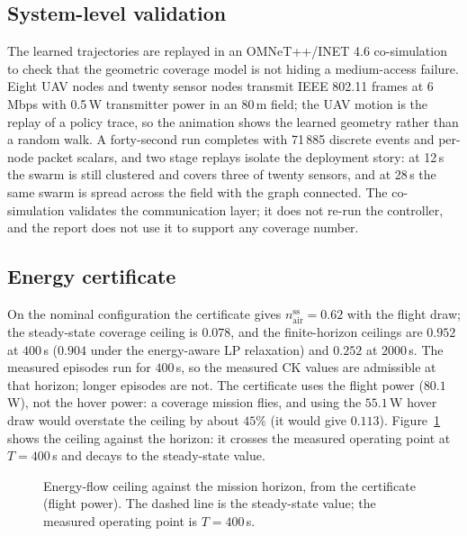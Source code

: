 \documentclass[conference]{IEEEtran}
\newcommand{\ck}{\mathrm{CK}}
\begin{document}
\subsection{System-level validation}
The learned trajectories are replayed in an OMNeT++/INET 4.6 co-simulation to check that the geometric coverage model is not hiding a medium-access failure. Eight UAV nodes and twenty sensor nodes transmit IEEE 802.11 frames at 6\,Mbps with 0.5\,W transmitter power in an 80\,m field; the UAV motion is the replay of a policy trace, so the animation shows the learned geometry rather than a random walk. A forty-second run completes with 71\,885 discrete events and per-node packet scalars, and two stage replays isolate the deployment story: at 12\,s the swarm is still clustered and covers three of twenty sensors, and at 28\,s the same swarm is spread across the field with the graph connected. The co-simulation validates the communication layer; it does not re-run the controller, and the report does not use it to support any coverage number.

\subsection{Energy certificate}
On the nominal configuration the certificate gives $n_{\mathrm{air}}^{\mathrm{ss}}=0.62$ with the flight draw; the steady-state coverage ceiling is $0.078$, and the finite-horizon ceilings are $0.952$ at $400$\,s ($0.904$ under the energy-aware LP relaxation) and $0.252$ at $2000$\,s. The measured episodes run for $400$\,s, so the measured $\ck$ values are admissible at that horizon; longer episodes are not. The certificate uses the flight power ($80.1$\,W), not the hover power: a coverage mission flies, and using the $55.1$\,W hover draw would overstate the ceiling by about $45\%$ (it would give $0.113$). Figure~\ref{fig:ceiling} shows the ceiling against the horizon: it crosses the measured operating point at $T=400$\,s and decays to the steady-state value.

\begin{figure}[t]
\centering
{}
\caption{Energy-flow ceiling against the mission horizon, from the certificate (flight power). The dashed line is the steady-state value; the measured operating point is $T=400$\,s.}
\label{fig:ceiling}
\end{figure}
\end{document}
